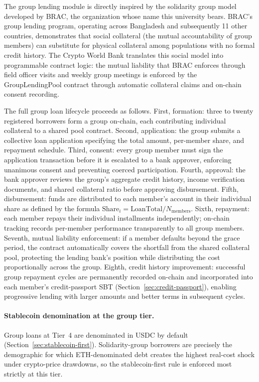 \documentclass[12pt,a4paper]{report}
\begin{document}
The group lending module is directly inspired by the solidarity group model developed by BRAC, the organization whose name this university bears. BRAC's group lending program, operating across Bangladesh and subsequently 11 other countries, demonstrates that social collateral (the mutual accountability of group members) can substitute for physical collateral among populations with no formal credit history. The Crypto World Bank translates this social model into programmable contract logic: the mutual liability that BRAC enforces through field officer visits and weekly group meetings is enforced by the GroupLendingPool contract through automatic collateral claims and on-chain consent recording.

The full group loan lifecycle proceeds as follows. First, formation: three to twenty registered borrowers form a group on-chain, each contributing individual collateral to a shared pool contract. Second, application: the group submits a collective loan application specifying the total amount, per-member share, and repayment schedule. Third, consent: every group member must sign the application transaction before it is escalated to a bank approver, enforcing unanimous consent and preventing coerced participation. Fourth, approval: the bank approver reviews the group's aggregate credit history, income verification documents, and shared collateral ratio before approving disbursement. Fifth, disbursement: funds are distributed to each member's account in their individual share as defined by the formula \(\text{Share}_i = \text{LoanTotal} / N_{\text{members}}\). Sixth, repayment: each member repays their individual installments independently; on-chain tracking records per-member performance transparently to all group members. Seventh, mutual liability enforcement: if a member defaults beyond the grace period, the contract automatically covers the shortfall from the shared collateral pool, protecting the lending bank's position while distributing the cost proportionally across the group. Eighth, credit history improvement: successful group repayment cycles are permanently recorded on-chain and incorporated into each member's credit-passport SBT (Section~\ref{sec:credit-passport}), enabling progressive lending with larger amounts and better terms in subsequent cycles.

\paragraph{Stablecoin denomination at the group tier.}
Group loans at Tier~4 are denominated in USDC by default (Section~\ref{sec:stablecoin-first}). Solidarity-group borrowers are precisely the demographic for which ETH-denominated debt creates the highest real-cost shock under crypto-price drawdowns, so the stablecoin-first rule is enforced most strictly at this tier.
\end{document}
